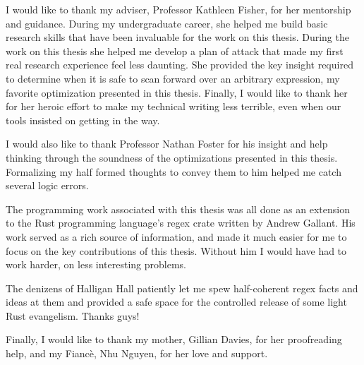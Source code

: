 \begin{thesisacknowledgments}

I would like to thank my adviser, Professor Kathleen Fisher, for her
mentorship and guidance. During my undergraduate career, she helped
me build basic research skills that have been invaluable for the
work on this thesis. During the work on this thesis she helped
me develop a plan of attack that made my first real research experience
feel less daunting. She provided the key insight required to
determine when it is safe to scan forward over an arbitrary expression,
my favorite optimization presented in this thesis. Finally,
I would like to thank her for her heroic effort to make my technical
writing less terrible, even when our tools insisted on getting in
the way.

I would also like to thank Professor Nathan Foster for his insight and 
help thinking through the soundness of the optimizations presented
in this thesis. Formalizing my half formed thoughts to convey them
to him helped me catch several logic errors.

The programming work associated with this thesis was all done as
an extension to the Rust programming language's regex crate written
by Andrew Gallant. His work served as a rich source of information,
and made it much easier for me to focus on the key contributions
of this thesis. Without him I would have had to work harder, on
less interesting problems.

The denizens of Halligan Hall patiently let me spew half-coherent
regex facts and ideas at them and provided a safe space for
the controlled release of some light Rust evangelism.
Thanks guys!

Finally, I would like to thank my mother, Gillian Davies, for 
her proofreading help, and my Fianc\`e, Nhu Nguyen, for her love and
support.

\end{thesisacknowledgments}
